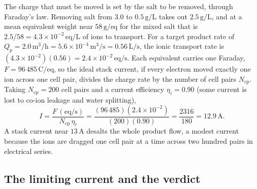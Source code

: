 The charge that must be moved is set by the salt to be removed, through
Faraday's law. Removing salt from $3.0$ to $0.5\,\text{g/L}$ takes out
$2.5\,\text{g/L}$, and at a mean equivalent weight near $58\,\text{g/eq}$ for
the mixed salt that is $2.5/58 = 4.3\times 10^{-2}\,\text{eq/L}$ of ions to
transport. For a target product rate of $Q_p = 2.0\,\text{m}^3/\text{h} =
5.6\times 10^{-4}\,\text{m}^3/\text{s} = 0.56\,\text{L/s}$, the ionic
transport rate is $(4.3\times 10^{-2})(0.56) = 2.4\times 10^{-2}\,\text{eq/s}$.
Each equivalent carries one Faraday, $F = 96\,485\,\text{C/eq}$, so the ideal
stack current, if every electron moved exactly one ion across one cell pair,
divides the charge rate by the number of cell pairs $N_{\text{cp}}$. Taking
$N_{\text{cp}} = 200$ cell pairs and a current efficiency $\eta_i = 0.90$
(some current is lost to co-ion leakage and water splitting),
\[
I = \frac{F\,(\text{eq/s})}{N_{\text{cp}}\,\eta_i} =
\frac{(96\,485)(2.4\times 10^{-2})}{(200)(0.90)} =
\frac{2316}{180} = 12.9\,\text{A}.
\]
A stack current near $13\,\text{A}$ desalts the whole product flow, a modest
current because the ions are dragged one cell pair at a time across two
hundred pairs in electrical series.

\subsection*{The limiting current and the verdict}

